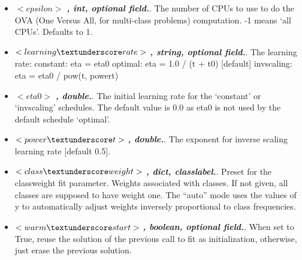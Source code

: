 \begin{itemize}
  \item $<epsilon>$ \textbf{\textit{, int, optional field.}}. The number of CPUs to use to do the OVA (One Versus All, for multi-class problems) computation. -1 means ‘all CPUs’. Defaults to 1.
  \item $<learning\textunderscore rate>$ \textbf{\textit{, string, optional field.}}. The learning rate: constant: eta = eta0 optimal: eta = 1.0 / (t + t0) [default] invscaling: eta = eta0 / pow(t, power\textunderscore t)
  \item $<eta0>$ \textbf{\textit{, double.}}. The initial learning rate for the ‘constant’ or ‘invscaling’ schedules. The default value is 0.0 as eta0 is not used by the default schedule ‘optimal’.
  \item $<power\textunderscore t>$ \textbf{\textit{, double.}}. The exponent for inverse scaling learning rate [default 0.5].
  \item $<class\textunderscore weight>$ \textbf{\textit{, dict, {class\textunderscore label}.}}. Preset for the class\textunderscore weight fit parameter. Weights associated with classes. If not given, all classes are supposed to have weight one. The “auto” mode uses the values of y to automatically adjust weights inversely proportional to class frequencies.
  \item $<warm\textunderscore start>$ \textbf{\textit{, boolean, optional field.}}. When set to True, reuse the solution of the previous call to fit as initialization, otherwise, just erase the previous solution.
\end{itemize}

